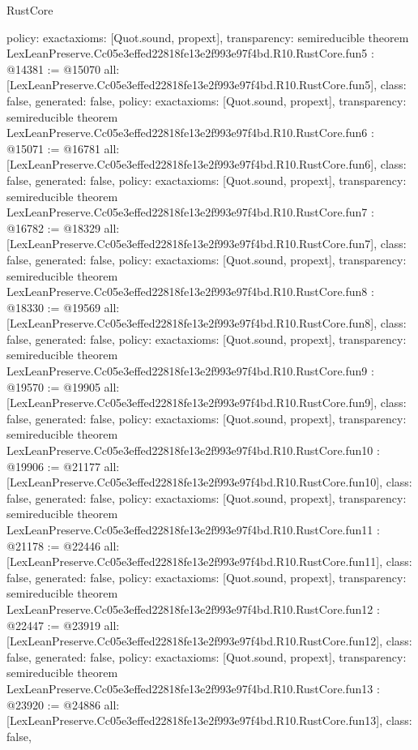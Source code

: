 \begin{lexlean}{RustCore}
\begin{coremodule}
{  policy: exact{axioms: [Quot.sound, propext]},
  transparency: semireducible
}
theorem LexLeanPreserve.Cc05e3effed22818fe13e2f993e97f4bd.R10.RustCore.fun5 : @14381 := @15070 {
  all: [LexLeanPreserve.Cc05e3effed22818fe13e2f993e97f4bd.R10.RustCore.fun5],
  class: false,
  generated: false,
  policy: exact{axioms: [Quot.sound, propext]},
  transparency: semireducible
}
theorem LexLeanPreserve.Cc05e3effed22818fe13e2f993e97f4bd.R10.RustCore.fun6 : @15071 := @16781 {
  all: [LexLeanPreserve.Cc05e3effed22818fe13e2f993e97f4bd.R10.RustCore.fun6],
  class: false,
  generated: false,
  policy: exact{axioms: [Quot.sound, propext]},
  transparency: semireducible
}
theorem LexLeanPreserve.Cc05e3effed22818fe13e2f993e97f4bd.R10.RustCore.fun7 : @16782 := @18329 {
  all: [LexLeanPreserve.Cc05e3effed22818fe13e2f993e97f4bd.R10.RustCore.fun7],
  class: false,
  generated: false,
  policy: exact{axioms: [Quot.sound, propext]},
  transparency: semireducible
}
theorem LexLeanPreserve.Cc05e3effed22818fe13e2f993e97f4bd.R10.RustCore.fun8 : @18330 := @19569 {
  all: [LexLeanPreserve.Cc05e3effed22818fe13e2f993e97f4bd.R10.RustCore.fun8],
  class: false,
  generated: false,
  policy: exact{axioms: [Quot.sound, propext]},
  transparency: semireducible
}
theorem LexLeanPreserve.Cc05e3effed22818fe13e2f993e97f4bd.R10.RustCore.fun9 : @19570 := @19905 {
  all: [LexLeanPreserve.Cc05e3effed22818fe13e2f993e97f4bd.R10.RustCore.fun9],
  class: false,
  generated: false,
  policy: exact{axioms: [Quot.sound, propext]},
  transparency: semireducible
}
theorem LexLeanPreserve.Cc05e3effed22818fe13e2f993e97f4bd.R10.RustCore.fun10 : @19906 := @21177 {
  all: [LexLeanPreserve.Cc05e3effed22818fe13e2f993e97f4bd.R10.RustCore.fun10],
  class: false,
  generated: false,
  policy: exact{axioms: [Quot.sound, propext]},
  transparency: semireducible
}
theorem LexLeanPreserve.Cc05e3effed22818fe13e2f993e97f4bd.R10.RustCore.fun11 : @21178 := @22446 {
  all: [LexLeanPreserve.Cc05e3effed22818fe13e2f993e97f4bd.R10.RustCore.fun11],
  class: false,
  generated: false,
  policy: exact{axioms: [Quot.sound, propext]},
  transparency: semireducible
}
theorem LexLeanPreserve.Cc05e3effed22818fe13e2f993e97f4bd.R10.RustCore.fun12 : @22447 := @23919 {
  all: [LexLeanPreserve.Cc05e3effed22818fe13e2f993e97f4bd.R10.RustCore.fun12],
  class: false,
  generated: false,
  policy: exact{axioms: [Quot.sound, propext]},
  transparency: semireducible
}
theorem LexLeanPreserve.Cc05e3effed22818fe13e2f993e97f4bd.R10.RustCore.fun13 : @23920 := @24886 {
  all: [LexLeanPreserve.Cc05e3effed22818fe13e2f993e97f4bd.R10.RustCore.fun13],
  class: false,
}
\end{coremodule}
\end{lexlean}
